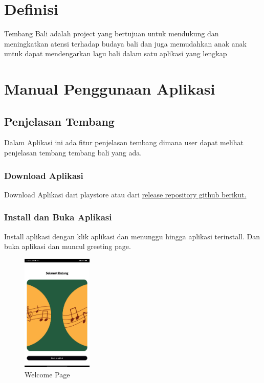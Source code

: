\documentclass[a4paper, 12pt]{article}
\begin{document}
\tableofcontents

\newpage

\section{Definisi}
Tembang Bali adalah project yang bertujuan untuk mendukung dan meningkatkan atensi terhadap budaya bali dan juga memudahkan 
anak anak untuk dapat mendengarkan lagu bali dalam satu aplikasi yang lengkap

\section{Manual Penggunaan Aplikasi}

\subsection{Penjelasan Tembang}
Dalam Aplikasi ini ada fitur penjelasan tembang dimana user dapat melihat penjelasan tembang tembang bali yang ada.
\subsubsection{Download Aplikasi}
Download Aplikasi dari playstore atau dari \href{https://github.com/rahdeva/tembang_bali}{release repository github berikut.} 

\subsubsection{Install dan Buka Aplikasi}
Install aplikasi dengan klik aplikasi dan menunggu hingga aplikasi terinstall. Dan buka aplikasi dan muncul greeting page.

\begin{figure}[H]
    \centering
    \includegraphics[width=0.3\textwidth]{assets/welcome.jpg}
    \caption{Welcome Page}
\end{figure}
\end{document}
